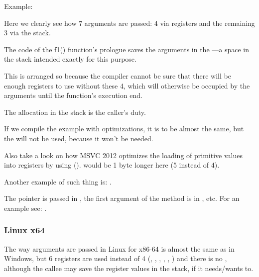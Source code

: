 Example:






Here we clearly see how 7 arguments are passed: 4 via registers and the remaining 3 via the stack.

The code of the f1() function's prologue saves the arguments in the ---a space in the stack
intended exactly for this purpose.

This is arranged so because the compiler cannot be sure that there will be enough registers to use without these 4,
which will otherwise be occupied by the arguments until the function's execution end.

The  allocation in the stack is the caller's duty.



If we compile the example with optimizations, it is to be almost the same, 
but the  will not be used, because it won't be needed.

\label{using_MOV_and_pack_of_LEA_to_load_values}

Also take a look on how MSVC 2012 optimizes the loading of primitive values into registers by using \LEA ().
 would be 1 byte longer here (5 instead of 4).

Another example of such thing is: .


The \ITthis pointer is passed in \RCX, the first argument of the method is in \RDX, etc.
For an example see: .
 
\subsubsection{Linux x64}

The way arguments are passed in Linux for x86-64 is almost the same as in Windows, but 6 registers are
used instead of 4 (\RDI, \RSI, \RDX, \RCX, , ) and there is no , 
although the \gls{callee} may save the register values in the stack, if it needs/wants to.


